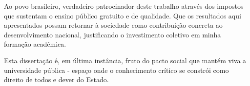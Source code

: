 \begin{agradecimentos}

Ao povo brasileiro, verdadeiro patrocinador deste trabalho através dos impostos que sustentam o ensino público gratuito e de qualidade. Que os resultados aqui apresentados possam retornar à sociedade como contribuição concreta ao desenvolvimento nacional, justificando o investimento coletivo em minha formação acadêmica.

Esta dissertação é, em última instância, fruto do pacto social que mantém viva a universidade pública - espaço onde o conhecimento crítico se constrói como direito de todos e dever do Estado.

\end{agradecimentos}